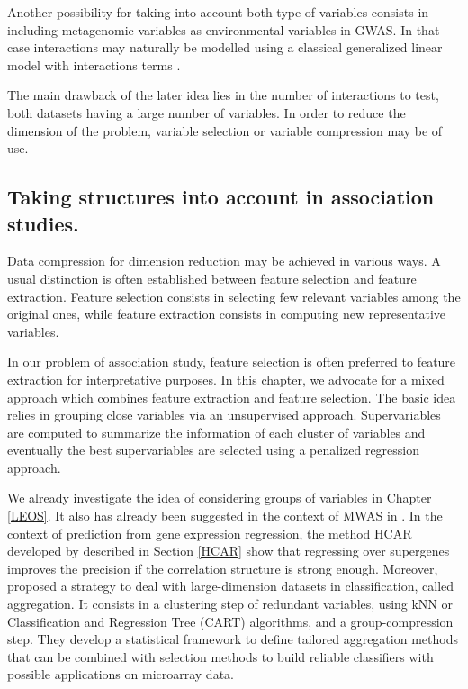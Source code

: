 \documentclass[]{book}
\begin{document}
Another possibility for taking into account both type of variables
consists in including metagenomic variables as environmental variables
in GWAS. In that case interactions may naturally be modelled using a
classical generalized linear model with interactions terms
\citep{lin2013interactionsGLM}.

The main drawback of the later idea lies in the number of interactions
to test, both datasets having a large number of variables. In order to
reduce the dimension of the problem, variable selection or variable
compression may be of use.

\hypertarget{taking-structures-into-account-in-association-studies.}{%
\subsection{Taking structures into account in association studies.}\label{taking-structures-into-account-in-association-studies.}}

Data compression for dimension reduction may be achieved in various
ways. A usual distinction is often established between feature selection
and feature extraction. Feature selection consists in selecting few
relevant variables among the original ones, while feature extraction
consists in computing new representative variables.

In our problem of association study, feature selection is often
preferred to feature extraction for interpretative purposes. In this
chapter, we advocate for a mixed approach which combines feature
extraction and feature selection. The basic idea relies in grouping
close variables via an unsupervised approach. Supervariables are
computed to summarize the information of each cluster of variables and
eventually the best supervariables are selected using a penalized
regression approach.

We already investigate the idea of considering groups of variables in
Chapter \ref{LEOS}. It also has already been suggested in the context
of MWAS in \citep{qin2012metagenome}. In the context of prediction from gene
expression regression, the method HCAR developed by
\citep{park_averaged_2007} described in Section \ref{HCAR} show that
regressing over supergenes improves the precision if the correlation
structure is strong enough. Moreover, \citep{mary2009tailored} proposed a
strategy to deal with large-dimension datasets in classification, called
aggregation. It consists in a clustering step of redundant variables,
using kNN or Classification and Regression Tree (CART) algorithms, and a
group-compression step. They develop a statistical framework to define
tailored aggregation methods that can be combined with selection methods
to build reliable classifiers with possible applications on microarray
data.
\end{document}
